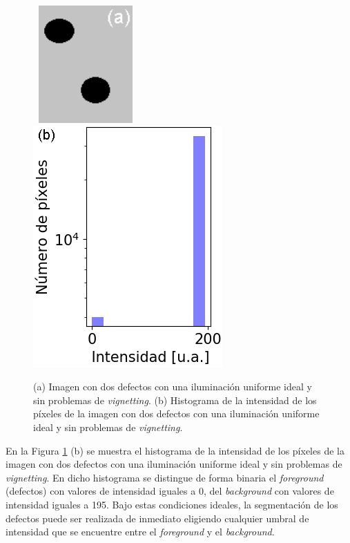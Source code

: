 \begin{figure}[H]
\hfill%
\includegraphics[width=4.0cm,height=4.5cm]{Figs/defectosZEISS/img_ideal_2defectos.png}
\hfill%
\includegraphics[scale=0.75]{Figs/defectosZEISS/hist_bg_condefectos_teorico.png}
\hfill%
\hfill%
\caption{(a) Imagen con dos defectos con una iluminación uniforme ideal y sin problemas de \textit{vignetting}. (b) Histograma de la intensidad de los píxeles de la imagen con dos defectos con una iluminación uniforme ideal y sin problemas de \textit{vignetting}.}
\label{fig:2d}
\end{figure}
En la Figura \ref{fig:2d} (b) se muestra el histograma de la intensidad de los píxeles de la imagen con dos defectos con una iluminación uniforme ideal y sin problemas de \textit{vignetting}. En dicho histograma se distingue de forma binaria el \textit{foreground} (defectos) con valores de intensidad iguales a 0, del \textit{background} con valores de intensidad iguales a 195. Bajo estas condiciones ideales, la segmentación de los defectos puede ser realizada de inmediato eligiendo cualquier umbral de intensidad que se encuentre entre el \textit{foreground} y el \textit{background}. 


\singlespacing
